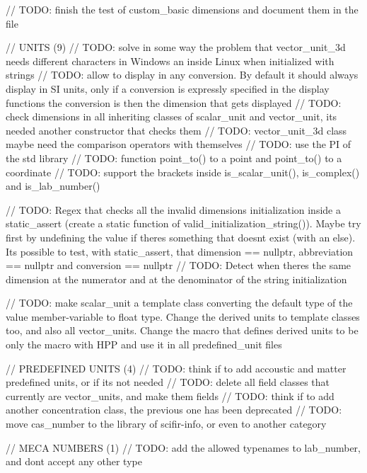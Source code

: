// TODO\+: finish the test of custom\+\_\+basic dimensions and document them in the  file

// UNITS (9) // TODO\+: solve in some way the problem that vector\+\_\+unit\+\_\+3d needs different characters in Windows an inside Linux when initialized with strings // TODO\+: allow to display in any conversion. By default it should always display in SI units, only if a conversion is expressly specified in the display functions the conversion is then the dimension that gets displayed // TODO\+: check dimensions in all inheriting classes of scalar\+\_\+unit and vector\+\_\+unit, it\textquotesingle{}s needed another constructor that checks them // TODO\+: vector\+\_\+unit\+\_\+3d class maybe need the comparison operators with themselves // TODO\+: use the PI of the std library // TODO\+: function point\+\_\+to() to a point and point\+\_\+to() to a coordinate // TODO\+: support the brackets inside is\+\_\+scalar\+\_\+unit(), is\+\_\+complex() and is\+\_\+lab\+\_\+number()

// TODO\+: Regex that checks all the invalid dimensions initialization inside a static\+\_\+assert (create a static function of valid\+\_\+initialization\+\_\+string()). Maybe try first by undefining the value if there\textquotesingle{}s something that doesn\textquotesingle{}t exist (with an else). It\textquotesingle{}s possible to test, with static\+\_\+assert, that dimension == nullptr, abbreviation == nullptr and conversion == nullptr // TODO\+: Detect when there\textquotesingle{}s the same dimension at the numerator and at the denominator of the string initialization

// TODO\+: make scalar\+\_\+unit a template class converting the default type of the value member-\/variable to float type. Change the derived units to template classes too, and also all vector\+\_\+units. Change the macro that defines derived units to be only the macro with HPP and use it in all predefined\+\_\+unit files

// PREDEFINED UNITS (4) // TODO\+: think if to add accoustic and matter predefined units, or if it\textquotesingle{}s not needed // TODO\+: delete all field classes that currently are vector\+\_\+units, and make them fields // TODO\+: think if to add another concentration class, the previous one has been deprecated // TODO\+: move cas\+\_\+number to the library of scifir-\/info, or even to another category

// MECA NUMBERS (1) // TODO\+: add the allowed typenames to lab\+\_\+number, and don\textquotesingle{}t accept any other type

